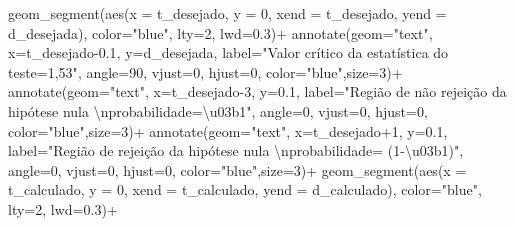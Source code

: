 \documentclass[
]{book}
\newenvironment{Shaded}{\begin{snugshade}}{\end{snugshade}}
\newcommand{\AttributeTok}[1]{\textcolor[rgb]{0.77,0.63,0.00}{#1}}
\newcommand{\DecValTok}[1]{\textcolor[rgb]{0.00,0.00,0.81}{#1}}
\newcommand{\FloatTok}[1]{\textcolor[rgb]{0.00,0.00,0.81}{#1}}
\newcommand{\FunctionTok}[1]{\textcolor[rgb]{0.00,0.00,0.00}{#1}}
\newcommand{\NormalTok}[1]{#1}
\newcommand{\SpecialCharTok}[1]{\textcolor[rgb]{0.00,0.00,0.00}{#1}}
\newcommand{\StringTok}[1]{\textcolor[rgb]{0.31,0.60,0.02}{#1}}
\begin{document}
\begin{Shaded}
\begin{Highlighting}[]
  \FunctionTok{geom\_segment}\NormalTok{(}\FunctionTok{aes}\NormalTok{(}\AttributeTok{x =}\NormalTok{ t\_desejado, }\AttributeTok{y =} \DecValTok{0}\NormalTok{, }\AttributeTok{xend =}\NormalTok{ t\_desejado, }\AttributeTok{yend =}\NormalTok{ d\_desejada), }\AttributeTok{color=}\StringTok{"blue"}\NormalTok{, }\AttributeTok{lty=}\DecValTok{2}\NormalTok{, }\AttributeTok{lwd=}\FloatTok{0.3}\NormalTok{)}\SpecialCharTok{+}
   \FunctionTok{annotate}\NormalTok{(}\AttributeTok{geom=}\StringTok{"text"}\NormalTok{, }\AttributeTok{x=}\NormalTok{t\_desejado}\FloatTok{{-}0.1}\NormalTok{, }\AttributeTok{y=}\NormalTok{d\_desejada, }\AttributeTok{label=}\StringTok{"Valor crítico da estatística do teste=1,53"}\NormalTok{, }\AttributeTok{angle=}\DecValTok{90}\NormalTok{, }\AttributeTok{vjust=}\DecValTok{0}\NormalTok{, }\AttributeTok{hjust=}\DecValTok{0}\NormalTok{, }\AttributeTok{color=}\StringTok{"blue"}\NormalTok{,}\AttributeTok{size=}\DecValTok{3}\NormalTok{)}\SpecialCharTok{+}
  \FunctionTok{annotate}\NormalTok{(}\AttributeTok{geom=}\StringTok{"text"}\NormalTok{, }\AttributeTok{x=}\NormalTok{t\_desejado}\DecValTok{{-}3}\NormalTok{, }\AttributeTok{y=}\FloatTok{0.1}\NormalTok{, }\AttributeTok{label=}\StringTok{"Região de não rejeição da hipótese nula }\SpecialCharTok{\textbackslash{}n}\StringTok{probabilidade=\textbackslash{}u03b1"}\NormalTok{, }\AttributeTok{angle=}\DecValTok{0}\NormalTok{, }\AttributeTok{vjust=}\DecValTok{0}\NormalTok{, }\AttributeTok{hjust=}\DecValTok{0}\NormalTok{, }\AttributeTok{color=}\StringTok{"blue"}\NormalTok{,}\AttributeTok{size=}\DecValTok{3}\NormalTok{)}\SpecialCharTok{+}
 \FunctionTok{annotate}\NormalTok{(}\AttributeTok{geom=}\StringTok{"text"}\NormalTok{, }\AttributeTok{x=}\NormalTok{t\_desejado}\SpecialCharTok{+}\DecValTok{1}\NormalTok{, }\AttributeTok{y=}\FloatTok{0.1}\NormalTok{, }\AttributeTok{label=}\StringTok{"Região de rejeição da hipótese nula }\SpecialCharTok{\textbackslash{}n}\StringTok{probabilidade= (1{-}\textbackslash{}u03b1)"}\NormalTok{, }\AttributeTok{angle=}\DecValTok{0}\NormalTok{, }\AttributeTok{vjust=}\DecValTok{0}\NormalTok{, }\AttributeTok{hjust=}\DecValTok{0}\NormalTok{, }\AttributeTok{color=}\StringTok{"blue"}\NormalTok{,}\AttributeTok{size=}\DecValTok{3}\NormalTok{)}\SpecialCharTok{+}
 \FunctionTok{geom\_segment}\NormalTok{(}\FunctionTok{aes}\NormalTok{(}\AttributeTok{x =}\NormalTok{ t\_calculado, }\AttributeTok{y =} \DecValTok{0}\NormalTok{, }\AttributeTok{xend =}\NormalTok{ t\_calculado, }\AttributeTok{yend =}\NormalTok{ d\_calculado), }\AttributeTok{color=}\StringTok{"blue"}\NormalTok{, }\AttributeTok{lty=}\DecValTok{2}\NormalTok{, }\AttributeTok{lwd=}\FloatTok{0.3}\NormalTok{)}\SpecialCharTok{+}

\end{Highlighting}
\end{Shaded}
\end{document}
